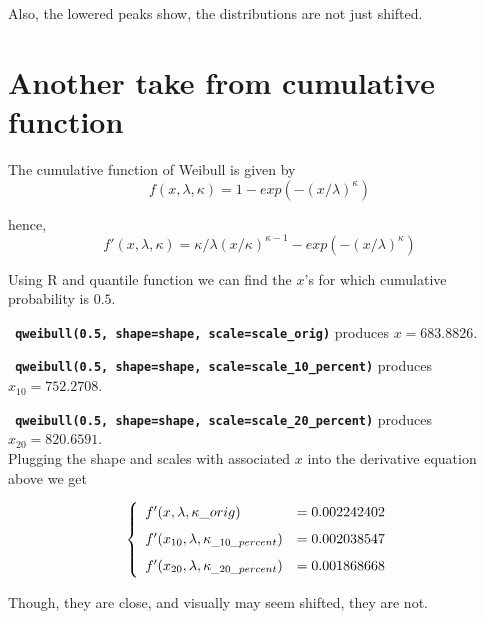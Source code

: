 \documentclass[12pt]{article}
\def\code#1{\textbf{\texttt{#1}}}
\theoremstyle{plain}
\theoremstyle{definition}
\theoremstyle{definition}
\begin{document}
Also, the lowered peaks show, the distributions are not 
just shifted.

\section{Another take from cumulative function}
The cumulative function of Weibull is given by
\[ f(x, \lambda, \kappa) = 1- exp(-(x/\lambda)^\kappa)\]

hence, 
\[ f'(x, \lambda, \kappa) = \kappa/\lambda (x/\kappa)^{\kappa-1} - exp(-(x/\lambda)^\kappa) \]

Using R and quantile function we can find the $x$'s for which cumulative probability is $0.5$.

\code{ qweibull(0.5, shape=shape, scale=scale\_orig)} produces $x = 683.8826$.

\code{ qweibull(0.5, shape=shape, scale=scale\_10\_percent)} produces $x_{10} = 752.2708$.

\code{ qweibull(0.5, shape=shape, scale=scale\_20\_percent)} produces $x_{20} = 820.6591$.\\

Plugging the shape and scales with associated $x$ into the derivative equation above we get



\begin{equation}
\left\{
  \begin{array}{lr}
    f'(x, \lambda, \kappa\_{orig})  &= 0.002242402 \vspace{.1in}\\
    f'(x_{10}, \lambda, \kappa_{\_10\_percent}) &= 0.002038547 \vspace{.1in}\\
    f'(x_{20}, \lambda, \kappa_{\_20\_percent}) &= 0.001868668
    
  \end{array}
\right.
\end{equation}

Though, they are close, and visually may seem shifted, they are not.
\end{document}
